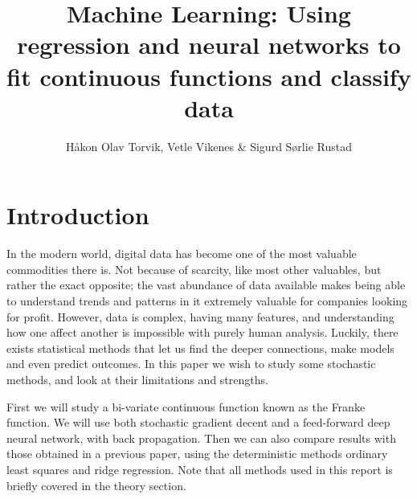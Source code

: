 \documentclass[12pt]{extarticle}
\author{\Large Håkon Olav Torvik, Vetle Vikenes \& Sigurd Sørlie Rustad}
\title{\Huge Machine Learning: Using regression and neural networks to fit continuous functions and classify data}
\affiliation{\large FYS-STK4155 – Applied Data Analysis and Machine Learning
\\Autumn 2021\\Department of Physics\\University of Oslo\\\\\today}
\begin{document}
\maketitle
\pagestyle{myplain}









\section{Introduction}
In the modern world, digital data has become one of the most valuable commodities there is. Not because of scarcity, like most other valuables, but rather the exact opposite; the vast abundance of data available makes being able to understand trends and patterns in it extremely valuable for companies looking for profit. However, data is complex, having many features, and understanding how one affect another is impossible with purely human analysis. Luckily, there exists statistical methods that let us find the deeper connections, make models and even predict outcomes. In this paper we wish to study some stochastic methods, and look at their limitations and strengths.

First we will study a bi-variate continuous function known as the Franke function. We will use both stochastic gradient decent and a feed-forward deep neural network, with back propagation. Then we can also compare results with those obtained in a previous paper, using the deterministic methods ordinary least squares and ridge regression. Note that all methods used in this report is briefly covered in the theory section.
\end{document}
